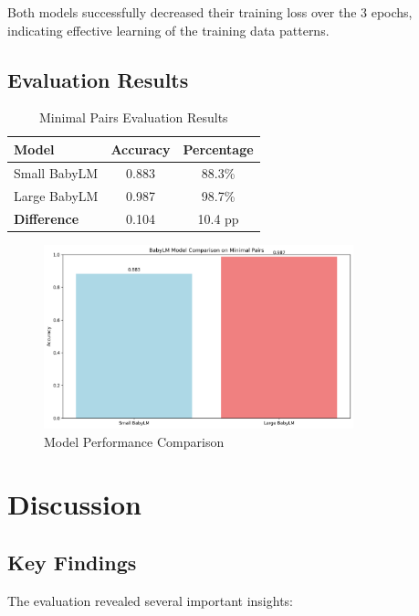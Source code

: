\documentclass[11pt,a4paper]{article}
\begin{document}
Both models successfully decreased their training loss over the 3 epochs, indicating effective learning of the training data patterns.

\subsection{Evaluation Results}

\begin{table}[h]
\centering
\begin{tabular}{lcc}
\toprule
\textbf{Model} & \textbf{Accuracy} & \textbf{Percentage} \\
\midrule
Small BabyLM & 0.883 & 88.3\% \\
Large BabyLM & 0.987 & 98.7\% \\
\midrule
\textbf{Difference} & 0.104 & 10.4 pp \\
\bottomrule
\end{tabular}
\caption{Minimal Pairs Evaluation Results}
\end{table}

\begin{figure}[h]
\centering
\includegraphics[width=0.8\textwidth]{model_comparison.png}
\caption{Model Performance Comparison}
\end{figure}

\section{Discussion}

\subsection{Key Findings}

The evaluation revealed several important insights:
\end{document}
